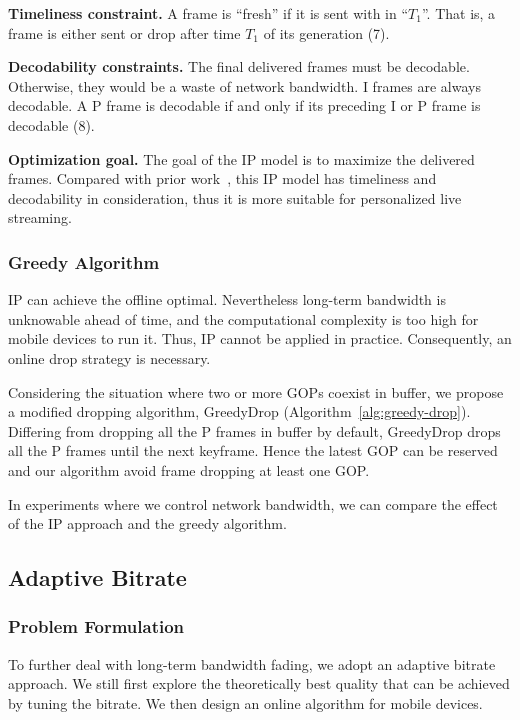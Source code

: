 \textbf{Timeliness constraint.}
A frame is ``fresh'' if it is sent with in ``$T_1$''. That is, a frame is either sent or drop after time $T_1$ of its generation (7).

\textbf{Decodability constraints.} The final delivered frames must be decodable. Otherwise, they would be a waste of network bandwidth. I frames are always decodable. A P frame is decodable if and only if its preceding I or P frame is decodable (8).

\textbf{Optimization goal.} The goal of the IP model is to maximize the delivered frames.
Compared with prior work~\cite{singh2004dynamic}, this IP model has timeliness and decodability in consideration, thus it is more suitable for personalized live streaming.


\subsubsection{Greedy Algorithm}

IP can achieve the offline optimal. Nevertheless long-term bandwidth is unknowable ahead of time, and the computational complexity is too high for mobile devices to run it. Thus, IP cannot be applied in practice. Consequently, an online drop strategy is necessary.

Considering the situation where two or more GOPs coexist in buffer, we propose a modified dropping algorithm, GreedyDrop (Algorithm~\ref{alg:greedy-drop}). Differing from dropping all the P frames in buffer by default, GreedyDrop drops all the P frames until the next keyframe. Hence the latest GOP can be reserved and our algorithm avoid frame dropping at least one GOP.

In experiments where we control network bandwidth, we can compare the effect of the IP approach and the greedy algorithm.

\subsection{Adaptive Bitrate}
\label{subsec:adaptive-bitrate}
\subsubsection{Problem Formulation}



To further deal with long-term bandwidth fading, we adopt an adaptive bitrate approach. We still first explore the theoretically best quality that can be achieved by tuning the bitrate. We then design an online algorithm for mobile devices.

